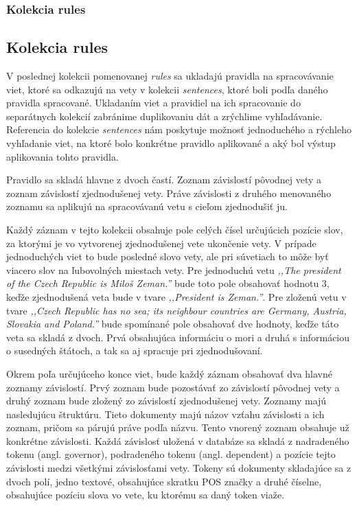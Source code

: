%
%
{
	\subsubsection{Kolekcia rules}
}
{
	\subsection{Kolekcia rules}
}
V poslednej kolekcii pomenovanej \textit{rules} sa ukladajú pravidla na spracovávanie viet, ktoré sa odkazujú na vety v kolekcii \textit{sentences}, ktoré boli podľa daného pravidla spracované. Ukladaním viet a pravidiel na ich spracovanie do separátnych kolekcií zabránime duplikovaniu dát a zrýchlime vyhľadávanie. Referencia do kolekcie \textit{sentences} nám poskytuje možnosť jednoduchého a rýchleho vyhľadanie viet, na ktoré bolo konkrétne pravidlo aplikované a aký bol výstup aplikovania tohto pravidla.

Pravidlo sa skladá hlavne z dvoch častí. Zoznam závislostí pôvodnej vety a zoznam závislostí zjednodušenej vety. Práve závislosti z druhého menovaného zoznamu sa aplikujú na spracovávanú vetu s cieľom zjednodušiť ju.

Každý záznam v tejto kolekcii obsahuje pole celých čísel určujúcich pozície slov, za ktorými je vo vytvorenej zjednodušenej vete ukončenie vety. V prípade jednoduchých viet to bude posledné slovo vety, ale pri súvetiach to môže byť viacero slov na ľubovolných miestach vety. Pre jednoduchú vetu \textit{,,The president of the Czech Republic is Miloš Zeman.''} bude toto pole obsahovať hodnotu 3, keďže zjednodušená veta bude v tvare \textit{,,President is Zeman.''}. Pre zloženú vetu v tvare \textit{,,Czech Republic has no sea; its neighbour countries are Germany, Austria, Slovakia and Poland.''} bude spomínané pole obsahovať dve hodnoty, keďže táto veta sa skladá z dvoch. Prvá obsahujúca informáciu o mori a druhá s informáciou o susedných štátoch, a tak sa aj spracuje pri zjednodušovaní.

Okrem poľa určujúceho konce viet, bude každý záznam obsahovať dva hlavné zoznamy závislostí. Prvý zoznam bude pozostávať zo závislostí pôvodnej vety a druhý zoznam bude zložený zo závislostí zjednodušenej vety. Zoznamy majú nasledujúcu štruktúru. Tieto dokumenty majú názov vzťahu závislosti a ich zoznam, pričom sa párujú práve podľa názvu. Tento vnorený zoznam obsahuje už konkrétne závislosti. Každá závislosť uložená v databáze sa skladá z nadradeného tokenu (angl. governor), podradeného tokenu (angl. dependent) a pozície tejto závislosti medzi všetkými závislosťami vety. Tokeny sú dokumenty skladajúce sa z dvoch polí, jedno textové, obsahujúce skratku POS značky a druhé číselne, obsahujúce pozíciu slova vo vete, ku ktorému sa daný token viaže.


